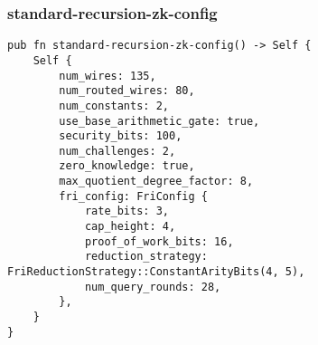 \subsubsection{standard-recursion-zk-config}
\label{standard-recursion-zk-config}


\begin{lstlisting}
pub fn standard-recursion-zk-config() -> Self {
    Self {
        num_wires: 135,
        num_routed_wires: 80,
        num_constants: 2,
        use_base_arithmetic_gate: true,
        security_bits: 100,
        num_challenges: 2,
        zero_knowledge: true,
        max_quotient_degree_factor: 8,
        fri_config: FriConfig {
            rate_bits: 3,
            cap_height: 4,
            proof_of_work_bits: 16,
            reduction_strategy: FriReductionStrategy::ConstantArityBits(4, 5),
            num_query_rounds: 28,
        },
    }
}
\end{lstlisting}